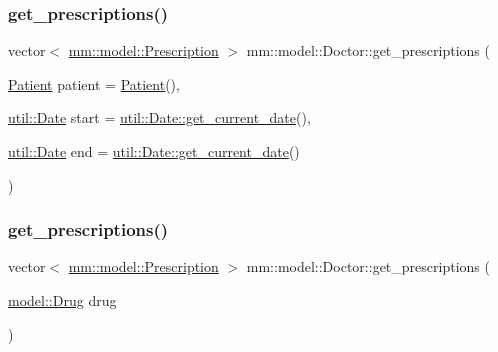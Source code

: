 \mbox{\label{classmm_1_1model_1_1_doctor_a38a5a7d04ea625f39422cb320af18800}} 
\subsubsection{\texorpdfstring{get\+\_\+prescriptions()}{get\_prescriptions()}\hspace{0.1cm}{\footnotesize\ttfamily [1/2]}}
{\footnotesize\ttfamily vector$<$ \mbox{\hyperlink{classmm_1_1model_1_1_prescription}{mm\+::model\+::\+Prescription}} $>$ mm\+::model\+::\+Doctor\+::get\+\_\+prescriptions (\begin{DoxyParamCaption}\item[{\mbox{\hyperlink{classmm_1_1model_1_1_patient}{Patient}}}]{patient = {\ttfamily \mbox{\hyperlink{classmm_1_1model_1_1_patient}{Patient}}()},  }\item[{\mbox{\hyperlink{structmm_1_1util_1_1_date}{util\+::\+Date}}}]{start = {\ttfamily \mbox{\hyperlink{structmm_1_1util_1_1_date_af0758fad7ef32fd535db3295136466eb}{util\+::\+Date\+::get\+\_\+current\+\_\+date}}()},  }\item[{\mbox{\hyperlink{structmm_1_1util_1_1_date}{util\+::\+Date}}}]{end = {\ttfamily \mbox{\hyperlink{structmm_1_1util_1_1_date_af0758fad7ef32fd535db3295136466eb}{util\+::\+Date\+::get\+\_\+current\+\_\+date}}()} }\end{DoxyParamCaption})}

\mbox{\label{classmm_1_1model_1_1_doctor_a76bf6b545709c7a784e4320b11f587bf}} 
\subsubsection{\texorpdfstring{get\+\_\+prescriptions()}{get\_prescriptions()}\hspace{0.1cm}{\footnotesize\ttfamily [2/2]}}
{\footnotesize\ttfamily vector$<$ \mbox{\hyperlink{classmm_1_1model_1_1_prescription}{mm\+::model\+::\+Prescription}} $>$ mm\+::model\+::\+Doctor\+::get\+\_\+prescriptions (\begin{DoxyParamCaption}\item[{\mbox{\hyperlink{classmm_1_1model_1_1_drug}{model\+::\+Drug}}}]{drug }\end{DoxyParamCaption})}

